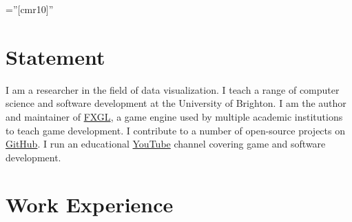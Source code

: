 \documentclass[a4paper,11pt]{article} %
\begin{document}
\pagestyle{empty} %

\font\fb=''[cmr10]'' %


\par{\bigskip\par} %

\section{Statement}

I am a researcher in the field of data visualization.
I teach a range of computer science and software development at the University of Brighton.
I am the author and maintainer of \href{https://github.com/AlmasB/FXGL}{FXGL}, a game engine used by multiple
academic institutions to teach game development.
I contribute to a number of open-source projects on \href{https://github.com/AlmasB}{GitHub}.
I run an educational \href{https://www.youtube.com/almasb0/videos}{YouTube} channel covering
game and software development.


\section{Work Experience}
\end{document}
